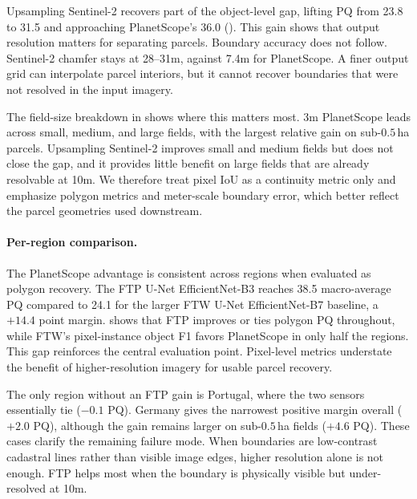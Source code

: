 \documentclass[10pt,twocolumn,letterpaper]{article}
\begin{document}
Upsampling Sentinel-2 recovers part of the object-level gap, lifting PQ from 23.8 to 31.5 and approaching PlanetScope's 36.0 (). This gain shows that output resolution matters for separating parcels. Boundary accuracy does not follow. Sentinel-2 chamfer stays at 28--31m, against 7.4m for PlanetScope. A finer output grid can interpolate parcel interiors, but it cannot recover boundaries that were not resolved in the input imagery.

The field-size breakdown in  shows where this matters most. 3m PlanetScope leads across small, medium, and large fields, with the largest relative gain on sub-$0.5$\,ha parcels. Upsampling Sentinel-2 improves small and medium fields but does not close the gap, and it provides little benefit on large fields that are already resolvable at 10m. We therefore treat pixel IoU as a continuity metric only and emphasize polygon metrics and meter-scale boundary error, which better reflect the parcel geometries used downstream.

\paragraph{Per-region comparison.}
The PlanetScope advantage is consistent across regions when evaluated as polygon recovery. The FTP U-Net EfficientNet-B3 reaches 38.5 macro-average PQ compared to 24.1 for the larger FTW U-Net EfficientNet-B7 baseline, a $+14.4$ point margin.  shows that FTP improves or ties polygon PQ throughout, while FTW's pixel-instance object F1 favors PlanetScope in only half the regions. This gap reinforces the central evaluation point. Pixel-level metrics understate the benefit of higher-resolution imagery for usable parcel recovery.

The only region without an FTP gain is Portugal, where the two sensors essentially tie ($-0.1$ PQ). Germany gives the narrowest positive margin overall ($+2.0$ PQ), although the gain remains larger on sub-$0.5$\,ha fields ($+4.6$ PQ). These cases clarify the remaining failure mode. When boundaries are low-contrast cadastral lines rather than visible image edges, higher resolution alone is not enough. FTP helps most when the boundary is physically visible but under-resolved at 10m.
\end{document}
